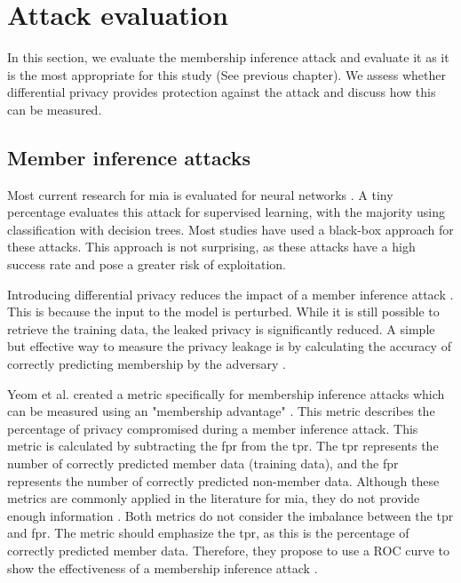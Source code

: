 \section{Attack evaluation} \label{theory:attack-evaluation}
In this section, we evaluate the membership inference attack and evaluate it as it is the most appropriate for this study (See previous chapter).
We assess whether differential privacy provides protection against the attack and discuss how this can be measured.
\subsection{Member inference attacks}
Most current research for \gls{mia} is evaluated for neural networks \citep{rigaki_survey_2021}.
A tiny percentage evaluates this attack for supervised learning, with the majority using classification with decision trees.
Most studies have used a black-box approach \citep{rigaki_survey_2021} for these attacks.
This approach is not surprising, as these attacks have a high success rate and pose a greater risk of exploitation.

Introducing differential privacy reduces the impact of a member inference attack \citep{rigaki_survey_2021,hu_membership_2022}.
This is because the input to the model is perturbed.
While it is still possible to retrieve the training data, the leaked privacy is significantly reduced.
A simple but effective way to measure the privacy leakage is by calculating the accuracy of correctly predicting membership by the adversary \citep{choquette-choo_label-only_2021}.

Yeom et al. created a metric specifically for membership inference attacks which can be measured using an "membership advantage" \citep{yeom_privacy_2018}.
This metric describes the percentage of privacy compromised during a member inference attack.
This metric is calculated by subtracting the \gls{fpr} from the \gls{tpr}.
The \gls{tpr} represents the number of correctly predicted member data (training data), and the \gls{fpr} represents the number of correctly predicted non-member data.
Although these metrics are commonly applied in the literature for \gls{mia}, they do not provide enough information \citep{carlini_membership_2022}.
Both metrics do not consider the imbalance between the \gls{tpr} and \gls{fpr}.
The metric should emphasize the \gls{tpr}, as this is the percentage of correctly predicted member data.
Therefore, they propose to use a ROC curve to show the effectiveness of a membership inference attack \citep{carlini_membership_2022}. \newline

